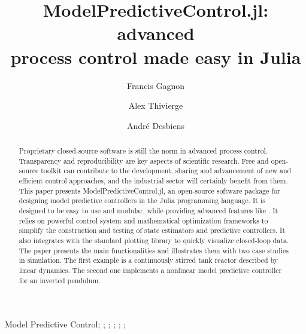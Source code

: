 \documentclass{ifacconf}
\begin{document}
\begin{frontmatter}

\title{ModelPredictiveControl.jl: advanced\\process control made easy in Julia}

\author[First]{Francis Gagnon} 
\author[First]{Alex Thivierge} 
\author[Second]{André Desbiens}
\author[Third]{}

\address[First]{Jumine Inc., Quebec City, QC, G1S 2K4, Canada}
\address[Second]{Process Observation and Optimization Laboratory (LOOP), Université Laval, Quebec City, QC, G1V 0A6, Canada}
\address[Third]{}

\begin{abstract} 
Proprietary closed-source software is still the norm in advanced process control. Transparency and reproducibility are key aspects of scientific research. Free and open-source toolkit can contribute to the development, sharing and advancement of  new and efficient control approaches, and the industrial sector will certainly benefit from them. This paper presents ModelPredictiveControl.jl, an open-source software package for designing model predictive controllers in the Julia programming language. It is designed to be easy to use and modular, while providing advanced features like . It relies on powerful control system and mathematical optimization frameworks to simplify the construction and testing of state estimators and predictive controllers. It also integrates with the standard plotting library to quickly visualize closed-loop data. The paper presents the main functionalities and illustrates them with two case studies in simulation. The first example is a continuously stirred tank reactor described by linear dynamics. The second one implements a nonlinear model predictive controller for an inverted pendulum.
\end{abstract}

\begin{keyword}
Model Predictive Control; ; ; ; ; ; 
\end{keyword}

\end{frontmatter}
\end{document}
